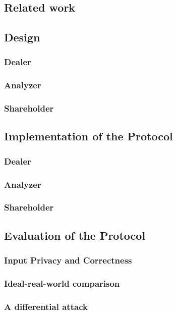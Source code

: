 \documentclass[12pt,a4paper]{scrartcl}				%
\begin{document}
\subsection{Related work}
\subsection{Design}
\subsubsection{Dealer}
\subsubsection{Analyzer}
\subsubsection{Shareholder}

\subsection{Implementation of the Protocol}
\subsubsection{Dealer}
\subsubsection{Analyzer}
\subsubsection{Shareholder}

\subsection{Evaluation of the Protocol}
\subsubsection{Input Privacy and Correctness}
\subsubsection{Ideal-real-world comparison}
\subsubsection{A differential attack}
\end{document}
